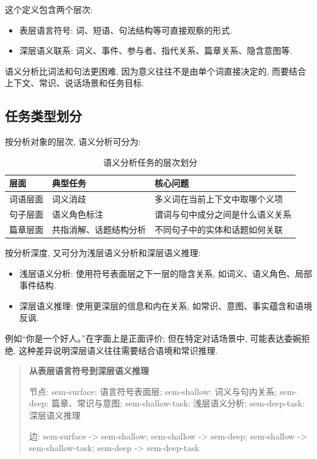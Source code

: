 这个定义包含两个层次:

\begin{itemize}
\item 表层语言符号: 词、短语、句法结构等可直接观察的形式.
\item 深层语义联系: 词义、事件、参与者、指代关系、篇章关系、隐含意图等.
\end{itemize}

语义分析比词法和句法更困难, 因为意义往往不是由单个词直接决定的,
而要结合上下文、常识、说话场景和任务目标.

\subsection{任务类型划分}


按分析对象的层次, 语义分析可分为:

\begin{table}[H]
\centering
\begingroup
\setlength{\tabcolsep}{2pt}
\small
\caption{语义分析任务的层次划分}
\begin{tabular}{|p{}|p{}|p{}|}
\hline
层面 & 典型任务 & 核心问题 \\ \hline
词语层面 & 词义消歧 & 多义词在当前上下文中取哪个义项 \\ \hline
句子层面 & 语义角色标注 & 谓词与句中成分之间是什么语义关系 \\ \hline
篇章层面 & 共指消解、话题结构分析 & 不同句子中的实体和话题如何关联 \\ \hline
\end{tabular}
\endgroup
\end{table}

按分析深度, 又可分为浅层语义分析和深层语义推理:

\begin{itemize}
\item 浅层语义分析: 使用符号表面层之下一层的隐含关系, 如词义、语义角色、局部事件结构.
\item 深层语义推理: 使用更深层的信息和内在关系, 如常识、意图、事实蕴含和语境反讽.
\end{itemize}

例如“你是一个好人。”在字面上是正面评价;
但在特定对话场景中, 可能表达委婉拒绝.
这种差异说明深层语义往往需要结合语境和常识推理.

\begin{quote}
\small
\textbf{从表层语言符号到深层语义推理}
\par 节点: sem-surface: 语言符号表面层; sem-shallow: 词义与句内关系; sem-deep: 篇章、常识与意图; sem-shallow-task: 浅层语义分析; sem-deep-task: 深层语义推理
\par 边: sem-surface -\textgreater{} sem-shallow; sem-shallow -\textgreater{} sem-deep; sem-shallow -\textgreater{} sem-shallow-task; sem-deep -\textgreater{} sem-deep-task
\end{quote}

